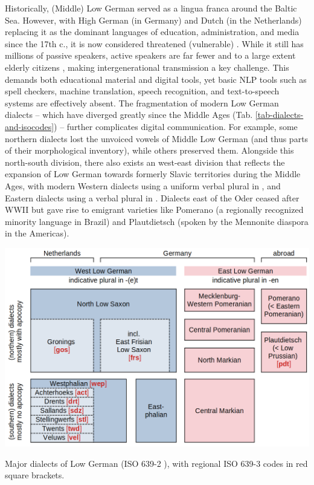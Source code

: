 Historically, (Middle) Low German served as a lingua franca around the Baltic Sea. However, with High German (in Germany) and Dutch (in the Netherlands) replacing it as the dominant languages of education, administration, and media since the 17th c., it is now considered threatened (vulnerable) \cite[p.25]{moseley2010atlas}. While it still has millions of passive speakers, active speakers are far fewer and to a large extent elderly citizens \cite{AdlerEhlersGoltzetal.2019}, making intergenerational transmission a key challenge. This demands both educational material and digital tools, yet basic NLP tools such as spell checkers, machine translation, speech recognition, and text-to-speech systems are effectively absent. The fragmentation of modern Low German dialects -- which have diverged greatly since the Middle Ages (Tab. \ref{tab-dialects-and-isocodes}) -- further complicates digital communication. For example, some northern dialects lost the unvoiced vowels of Middle Low German (and thus parts of their morphological inventory), while others preserved them. Alongside this north-south division, there also exists an west-east division that reflects the expansion of Low German towards formerly Slavic territories during the Middle Ages, with modern Western dialects using a uniform verbal plural in , and Eastern dialects using a verbal plural in . Dialects east of the Oder ceased after WWII but gave rise to emigrant varieties like Pomerano (a regionally recognized minority language in Brazil) and Plautdietsch (spoken by the Mennonite diaspora in the Americas).

\begin{table}
    \centering
    \includegraphics[width=1.0\linewidth]{img/dialects-and-iso632-codes.png}
    \caption{Major dialects of Low German (ISO 639-2 ), with regional ISO 639-3 codes in red square brackets.}
    \label{tab-dialects-and-isocodes}
\end{table}

